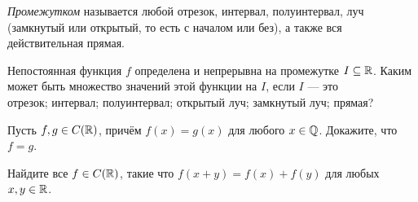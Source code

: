 \documentclass[a4paper,12pt]{article}
\begin{document}
{\em Промежутком} называется любой отрезок, интервал, полуинтервал, луч (замкнутый или открытый, то есть с началом или без), а также вся действительная прямая.

%
Непостоянная функция $f$ определена и непрерывна на промежутке
$I\subseteq\mathbb{R}$.  Каким может быть множество значений этой функции
на $I$, если $I$ --- это\\
 отрезок;  интервал;  полуинтервал;  открытый луч;  замкнутый луч;  прямая?

Пусть $f,g\in C(\mathbb{R})$, причём $f(x)=g(x)$ для
любого $x\in\mathbb{Q}$. Докажите, что %
$f=g$.


Найдите все $f\in C(\mathbb{R})$, %
такие что
$f(x+y)=f(x)+f(y)$ для любых $x,y\in\mathbb{R}$.




\end{document}
